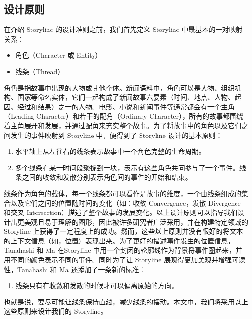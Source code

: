 \subsection{设计原则}
在介绍 Storyline 的设计准则之前，我们首先定义 Storyline 中最基本的一对映射关系：
\begin{itemize}
\item 角色（Character 或 Entity）
\item 线条（Thread）
\end{itemize}
角色是指故事中出现的人物或其他个体。新闻语料中，角色可以是人物、组织机构、国家等命名实体，它们一起构成了新闻故事六要素（时间、地点、人物、起因、经过和结果）之一的人物。电影、小说和新闻事件等通常都会有一个主角（Leading Character）和若干的配角（Ordinary Character），所有的故事都围绕着主角展开和发展，并通过配角来充实整个故事。为了将故事中的角色以及它们之间发生的事件映射到 Storyline 中，便得到了 Storyline 设计的基本原则：
\begin{enumerate}[(1)]
\item 水平轴上从左往右的线条表示故事中一个角色完整的生命周期。
\item 多个线条在某一时间段聚拢到一块，表示有这些角色共同参与了一个事件。线条之间的收敛和发散分别表示角色间的事件的开始和结束。
\end{enumerate}
线条作为角色的载体，每一个线条都可以看作是故事的维度，一个由线条组成的集合以及它们之间的位置随时间的变化（如：收敛 Convergence，发散 Divergence 和交叉 Intersection）描述了整个故事的发展变化。以上设计原则可以指导我们设计出更美观且易于理解的图形，因此被许多研究者广泛采用\cite{Ogawa:2010, Kim:2010}，并在构建特定领域的 Storyline 上获得了一定程度上的成功。然而，这些以上原则并没有很好的将文本的上下文信息（如，位置）表现出来。为了更好的描述事件发生的位置信息，Tanahashi 和 Ma \cite{tanahashi2012design} 在Storyline 中用一个封闭的轮廓线作为背景将事件圈起来，并用不同的颜色表示不同的事件。同时为了让 Storyline 展现得更加美观并增强可读性，Tanahashi 和 Ma 还添加了一条新的标准：
\begin{enumerate}[(3)]
\item 线条只有在收敛和发散的时候才可以偏离原始的方向。
\end{enumerate}
也就是说，要尽可能让线条保持直线，减少线条的摆动。本文中，我们将采用以上这些原则来设计我们的 Storyline。

